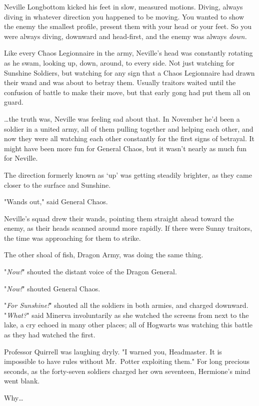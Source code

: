 Neville Longbottom kicked his feet in slow, measured motions. Diving, always 
diving in whatever direction you happened to be moving. You wanted to show the 
enemy the smallest profile, present them with your head or your feet. So you 
were always diving, downward and head-first, and the enemy was always 
\emph{down.}

Like every Chaos Legionnaire in the army, Neville's head was constantly 
rotating as he swam, looking up, down, around, to every side. Not just watching 
for Sunshine Soldiers, but watching for any sign that a Chaos Legionnaire had 
drawn their wand and was about to betray them. Usually traitors waited until 
the confusion of battle to make their move, but that early gong had put them 
all on guard.

{\ldots}the truth was, Neville was feeling sad about that. In November he'd 
been a soldier in a united army, all of them pulling together and helping each 
other, and now they were all watching each other constantly for the first signs 
of betrayal. It might have been more fun for General Chaos, but it wasn't 
nearly as much fun for Neville.

The direction formerly known as `up' was getting steadily brighter, as they 
came closer to the surface and Sunshine.

"Wands out," said General Chaos.

Neville's squad drew their wands, pointing them straight ahead toward the 
enemy, as their heads scanned around more rapidly. If there were Sunny 
traitors, the time was approaching for them to strike.

The other shoal of fish, Dragon Army, was doing the same thing.

"\emph{Now!}" shouted the distant voice of the Dragon General.

"\emph{Now!}" shouted General Chaos.

"\emph{For Sunshine!}" shouted all the soldiers in both armies, and charged 
downward.
\sbreak
"\emph{What?}" said Minerva involuntarily as she watched the screens from next 
to the lake, a cry echoed in many other places; all of Hogwarts was watching 
this battle as they had watched the first.

Professor Quirrell was laughing dryly. "I warned you, Headmaster. It is 
impossible to have rules without Mr.~Potter exploiting them."
\sbreak
For long precious seconds, as the forty-seven soldiers charged her own 
seventeen, Hermione's mind went blank.

Why{\ldots}

